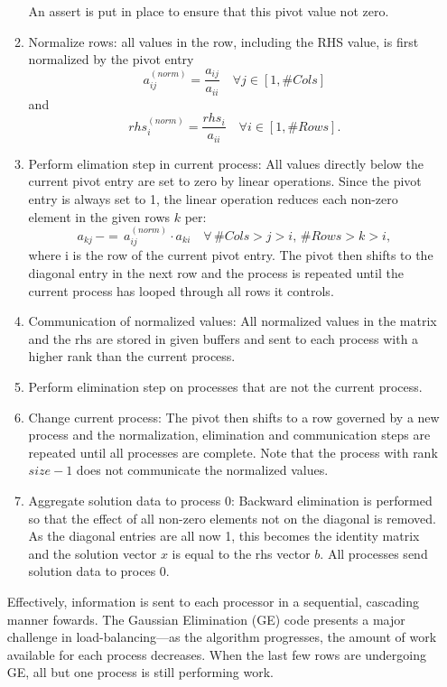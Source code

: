 \begin{enumerate}
\begin{enumerate}
An assert is put in place to ensure that this pivot value not zero. 
\item Normalize rows: all values in the row, including the RHS value, is first normalized by the pivot entry 
\begin{equation*}
	a_{ij}^{(norm)} = \frac{a_{ij}}{a_{ii}} \quad \forall j \in [1, \# Cols]
\end{equation*}
and 
\begin{equation*}
rhs_{i}^{(norm)} = \frac{rhs_{i}}{a_{ii}} \quad \forall i \in [1, \# Rows].
\end{equation*}

\item Perform elimation step in current process: All values directly below the current pivot entry are set to zero by linear operations. Since the pivot entry is always set to 1, the linear operation reduces each non-zero element in the given rows $k$ per:
\begin{equation*}
	a_{kj} \,-=\, a_{ij}^{(norm)} \cdot a_{ki} \quad \forall \,\# Cols > j > i, \,\# Rows > k > i,
\end{equation*}
where i is the row of the current pivot entry. The pivot then shifts to the diagonal entry in the next row and the process is repeated until the current process has looped through all rows it controls.
\item Communication of normalized values: All normalized values in the matrix and the rhs are stored in given buffers and sent to each process with a higher rank than the current process. 
\item Perform elimination step on processes that are not the current process.
\item Change current process: The pivot then shifts to a row governed by a new process and the normalization, elimination and communication steps are repeated until all processes are complete. Note that the process with rank $size-1$ does not communicate the normalized values.
\item Aggregate solution data to process 0: Backward elimination is performed so that the effect of all non-zero elements not on the diagonal is removed. As the diagonal entries are all now 1, this becomes the identity matrix and the solution vector $x$ is equal to the rhs vector $b$. All processes send solution data to proces 0.
\end{enumerate}

Effectively, information is sent to each processor in a sequential, cascading manner fowards. The Gaussian Elimination (GE) code presents a major challenge in load-balancing---as the algorithm progresses, the amount of work available for each process decreases. When the last few rows are undergoing GE, all but one process is still performing work. 


\end{enumerate}
